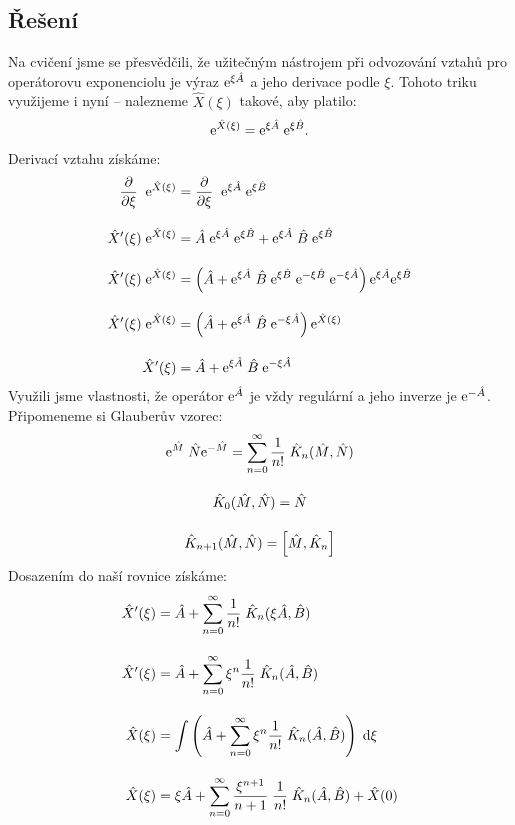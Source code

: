 \documentclass[10pt,a4paper]{article}
\newcommand{\const}[1]{\text{\rmfamily\upshape #1}}
\renewcommand{\d}[1]{\;\const{d}#1}
\newcommand{\pd}[2]{\frac{\partial  #1}{\partial  #2} \;}
\newcommand{\e}[1]{\const{e}^{#1}}
\begin{document}
\subsection{Řešení}
Na cvičení jsme se přesvědčili, že užitečným nástrojem při odvozování vztahů pro operátorovu exponenciolu je výraz $\e{\xi \hat A}$ a jeho derivace podle $\xi$. Tohoto triku využijeme i nyní – nalezneme $\hat X(\xi)$ takové, aby platilo:
\begin{align*}
    \e{\hat X(\xi)} = \e{\xi \hat A} \; \e{\xi \hat B}.
\end{align*}
Derivací vztahu získáme:
\begin{align*}
    \pd{}{\xi} \; \e{\hat X(\xi)} &= \pd{}{\xi} \; \e{\xi \hat A} \; \e{\xi \hat B}
    \\[10pt]
    \hat X'(\xi) \; \e{\hat X(\xi)} &= \hat A \; \e{\xi \hat A} \; \e{\xi \hat B} + \e{\xi \hat A} \; \hat B \; \e{\xi \hat B}
    \\[10pt]
    \hat X'(\xi) \; \e{\hat X(\xi)} &= \left( \hat A  + \e{\xi \hat A} \; \hat B \; \e{\xi \hat B} \; \e{-\xi \hat B} \; \e{-\xi \hat A} \right) \e{\xi \hat A} \e{\xi \hat B}
    \\[10pt]
    \hat X'(\xi) \; \e{\hat X(\xi)} &= \left( \hat A  + \e{\xi \hat A} \; \hat B \; \e{-\xi \hat A} \right) \e{\hat X(\xi)}
    \\[10pt]
    \hat X'(\xi) &= \hat A  + \e{\xi \hat A} \; \hat B \; \e{-\xi \hat A}
\end{align*}
Využili jsme vlastnosti, že operátor $\e{\hat A}$ je vždy regulární a jeho inverze je $\e{-\hat A}$. Připomeneme si Glauberův vzorec:
\begin{gather*}
    \e{\hat M} \; \hat N \e{-\hat M}
    = \sum_{n=0}^\infty \frac{1}{n!} \; \hat K_n(\hat M, \hat N)
    \\[10pt]
    \hat K_0(\hat M, \hat N) = \hat N
    \\[10pt]
    \hat K_{n+1}(\hat M, \hat N) = \left[ \hat M, \hat K_n \right]
\end{gather*}
Dosazením do naší rovnice získáme:
\begin{align*}
    \hat X'(\xi) &= \hat A + \sum_{n=0}^\infty \frac{1}{n!} \; \hat K_n(\xi \hat A, \hat B)
    \\[10pt]
    \hat X'(\xi) &= \hat A + \sum_{n=0}^\infty \xi^n \frac{1}{n!} \; \hat K_n(\hat A, \hat B)
    \\[10pt]
    \hat X(\xi) &= \int \left( \hat A + \sum_{n=0}^\infty \xi^n \frac{1}{n!} \; \hat K_n(\hat A, \hat B) \right) \d{\xi}
    \\[10pt]
    \hat X(\xi) &= \xi \hat A + \sum_{n=0}^\infty \frac{\xi^{n+1}}{n+1} \; \frac{1}{n!} \; \hat K_n(\hat A, \hat B) + \hat X(0)
\end{align*}
\end{document}
